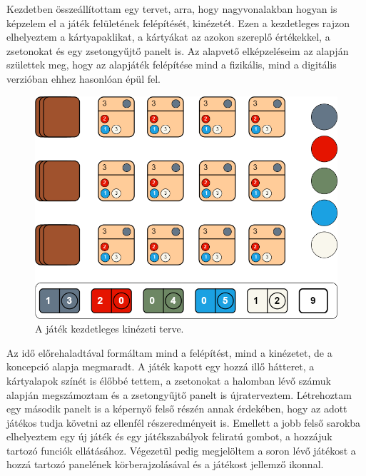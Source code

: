 
Kezdetben összeállítottam egy tervet, arra, hogy nagyvonalakban hogyan is képzelem el a játék felületének felépítését, kinézetét. Ezen a kezdetleges rajzon elhelyeztem a kártyapaklikat, a kártyákat az azokon szereplő értékekkel, a zsetonokat és egy zsetongyűjtő panelt is. Az alapvető elképzeléseim az alapján születtek meg, hogy az alapjáték felépítése mind a fizikális, mind a digitális verzióban ehhez hasonlóan épül fel.

\begin{figure}[h]
\centering
\includegraphics[scale=0.37]{images/screen_structure_plan.png}
\caption{A játék kezdetleges kinézeti terve.}
\label{fig:screen_structure_plan}
\end{figure}

\newpage

Az idő előrehaladtával formáltam mind a felépítést, mind a kinézetet, de a koncepció alapja megmaradt. A játék kapott egy hozzá illő hátteret, a kártyalapok színét is élőbbé tettem, a zsetonokat a halomban lévő számuk alapján megszámoztam és a zsetongyűjtő panelt is újraterveztem. Létrehoztam egy második panelt is a képernyő felső részén annak érdekében, hogy az adott játékos tudja követni az ellenfél részeredményeit is.
Emellett a jobb felső sarokba elhelyeztem egy új játék és egy játékszabályok feliratú gombot, a hozzájuk tartozó funciók ellátásához. Végezetül pedig megjelöltem a soron lévő játékost a hozzá tartozó panelének körberajzolásával és a játékost jellemző ikonnal.

